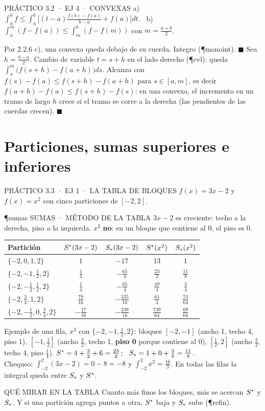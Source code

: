 \begin{enunciado}{PRÁCTICO 3.2 · EJ 4 · CONVEXAS}
a) $\int_a^bf\le\int_a^b\Big[(t-a)\frac{f(b)-f(a)}{b-a}+f(a)\Big]dt$. \ b) $\int_a^{m}(f-f(a))\le\int_m^b(f-f(m))$ con $m=\frac{a+b}2$.
\end{enunciado}
Por 2.2.6 c), una convexa queda debajo de su cuerda. Integro (\P{monoint}). $\blacksquare$
Sea $h=\frac{b-a}2$. Cambio de variable $t=s+h$ en el lado derecho (\P{cvl}): queda $\int_a^m\big(f(s+h)-f(a+h)\big)ds$. Alcanza con $f(s)-f(a)\le f(s+h)-f(a+h)$ para $s\in[a,m]$, es decir $f(a+h)-f(a)\le f(s+h)-f(s)$: en una convexa, el incremento en un tramo de largo $h$ crece si el tramo se corre a la derecha (las pendientes de las cuerdas crecen). $\blacksquare$

\section{Particiones, sumas superiores e inferiores}

\begin{enunciado}{PRÁCTICO 3.3 · EJ 1 · LA TABLA DE BLOQUES}
$f(x)=3x-2$ y $f(x)=x^2$ con cinco particiones de $[-2,2]$.
\end{enunciado}
\begin{uso}{\P{sumas} SUMAS · MÉTODO DE LA TABLA}
$3x-2$ es creciente: techo a la derecha, piso a la izquierda. $x^2$ \textbf{no}: en un bloque que contiene al 0, el piso es 0.
\end{uso}
\begin{center}\small
\begin{tabular}{@{}lcccc@{}}\toprule
Partición & $S^{*}(3x-2)$ & $S_{*}(3x-2)$ & $S^{*}(x^2)$ & $S_{*}(x^2)$\\\midrule
$\{-2,0,1,2\}$ & $1$ & $-17$ & $13$ & $1$\\
$\{-2,-1,\frac12,2\}$ & $\frac14$ & $-\frac{65}4$ & $\frac{23}2$ & $\frac{11}8$\\
$\{-2,-\frac12,\frac12,2\}$ & $\frac14$ & $-\frac{65}4$ & $\frac{49}4$ & $\frac34$\\
$\{-2,\frac34,1,2\}$ & $\frac{79}{16}$ & $-\frac{335}{16}$ & $\frac{61}4$ & $\frac{73}{64}$\\
$\{-2,-\frac12,0,\frac34,2\}$ & $-\frac{17}{16}$ & $-\frac{239}{16}$ & $\frac{739}{64}$ & $\frac{69}{64}$\\\bottomrule
\end{tabular}
\end{center}
Ejemplo de una fila, $x^2$ con $\{-2,-1,\frac12,2\}$: bloques $[-2,-1]$ (ancho 1, techo 4, piso 1), $[-1,\frac12]$ (ancho $\frac32$, techo 1, \textbf{piso 0} porque contiene al 0), $[\frac12,2]$ (ancho $\frac32$, techo 4, piso $\frac14$). $S^{*}=4+\frac32+6=\frac{23}2$; \ $S_{*}=1+0+\frac38=\frac{11}8$.\\
Chequeo: $\int_{-2}^2(3x-2)=0-8=-8$ y $\int_{-2}^2x^2=\frac{16}3$. En todas las filas la integral queda entre $S_{*}$ y $S^{*}$.\ok
\begin{tip}{QUÉ MIRAR EN LA TABLA}
Cuanto más finos los bloques, más se acercan $S^{*}$ y $S_{*}$. Y si una partición agrega puntos a otra, $S^{*}$ baja y $S_{*}$ sube (\P{refin}).
\end{tip}

